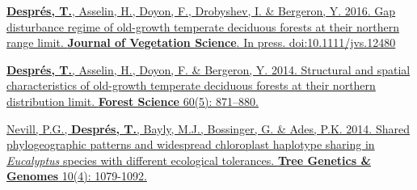 \vspace{-5mm} 
\begin{cventries}
  \cventry
    {}
    {}
    {}
    {}
    {
      \begin{cvitems}
          \setlength{\itemindent}{-2em}
        \item[] {\href{http://onlinelibrary.wiley.com/doi/10.1111/jvs.12480/full}{{\normalsize \textbf{Després, T.}, Asselin, H., Doyon,
              F., Drobyshev, I. \& Bergeron, Y. 2016. Gap disturbance
              regime of old-growth temperate deciduous forests at
              their northern range limit. \textbf{Journal of Vegetation
              Science}. In press. doi:10.1111/jvs.12480}}}
      \item[]{}
                      \item[] {\href{http://www.ingentaconnect.com/content/saf/fs/2014/00000060/00000005/art00007}{{\normalsize \textbf{Després, T.}, Asselin, H., Doyon,
                  F. \& Bergeron, Y. 2014. Structural and spatial
                  characteristics of old-growth temperate deciduous
                  forests at their northern distribution limit. \textbf{Forest
                    Science} 60(5): 871–880.}}}
                        \item[]{}
                \item[] {\href{http://link.springer.com/article/10.1007/s11295-014-0744-y}{{\normalsize Nevill, P.G., \textbf{Després, T.}, Bayly, M.J., Bossinger, G. \& Ades, P.K. 2014. Shared phylogeographic patterns and widespread chloroplast haplotype sharing in \textit{Eucalyptus} species with different ecological tolerances. \textbf{Tree Genetics \& Genomes} 10(4): 1079-1092.}}}
                        \end{cvitems}
    }
 
  \end{cventries}
